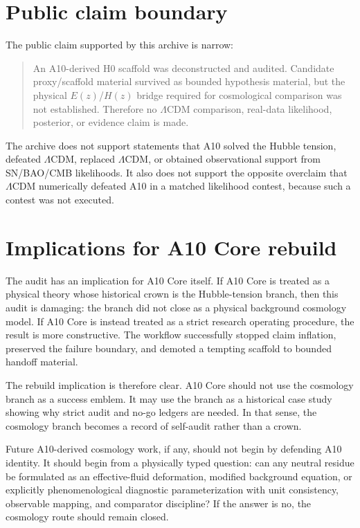 \documentclass[11pt,a4paper]{article}
\newcommand{\LCDM}{$\Lambda$CDM}
\newcommand{\Ez}{$E(z)$}
\newcommand{\Hz}{$H(z)$}
\begin{document}
\section{Public claim boundary}

The public claim supported by this archive is narrow:

\begin{quote}
An A10-derived H0 scaffold was deconstructed and audited. Candidate proxy/scaffold material survived as bounded hypothesis material, but the physical \Ez{}/\Hz{} bridge required for cosmological comparison was not established. Therefore no \LCDM{} comparison, real-data likelihood, posterior, or evidence claim is made.
\end{quote}

The archive does not support statements that A10 solved the Hubble tension, defeated \LCDM, replaced \LCDM, or obtained observational support from SN/BAO/CMB likelihoods. It also does not support the opposite overclaim that \LCDM{} numerically defeated A10 in a matched likelihood contest, because such a contest was not executed.

\section{Implications for A10 Core rebuild}

The audit has an implication for A10 Core itself. If A10 Core is treated as a physical theory whose historical crown is the Hubble-tension branch, then this audit is damaging: the branch did not close as a physical background cosmology model. If A10 Core is instead treated as a strict research operating procedure, the result is more constructive. The workflow successfully stopped claim inflation, preserved the failure boundary, and demoted a tempting scaffold to bounded handoff material.

The rebuild implication is therefore clear. A10 Core should not use the cosmology branch as a success emblem. It may use the branch as a historical case study showing why strict audit and no-go ledgers are needed. In that sense, the cosmology branch becomes a record of self-audit rather than a crown.

Future A10-derived cosmology work, if any, should not begin by defending A10 identity. It should begin from a physically typed question: can any neutral residue be formulated as an effective-fluid deformation, modified background equation, or explicitly phenomenological diagnostic parameterization with unit consistency, observable mapping, and comparator discipline? If the answer is no, the cosmology route should remain closed.
\end{document}

